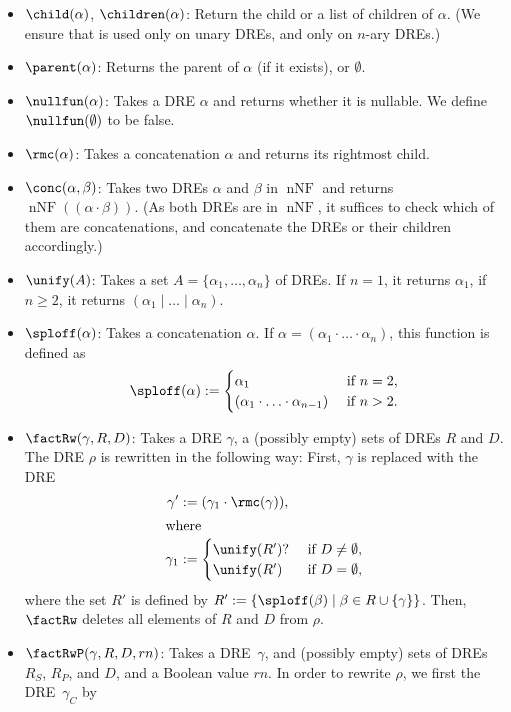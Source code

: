\documentclass[a4paper,11pt, svgnames,titlepage]{article}
\newcommand{\rxo}{\mathtt{?}}
\newcommand{\rxc}{\cdot}
\DeclareMathOperator{\ror}{\mathtt{|}}
\newcommand{\df}{:=}
\DeclareMathOperator{\nnf}{nNF}
\begin{document}
\begin{itemize}
	\item $\child(\alpha)$, $\children(\alpha)$: Return the child or a list of children of $\alpha$. (We ensure that \child is used only on unary DREs, and \children only on $n$-ary DREs.)
	\item $\parent(\alpha)$: Returns the parent of $\alpha$ (if it exists), or $\emptyset$.
	\item $\nullfun(\alpha)$: Takes a DRE $\alpha$ and returns whether it is nullable. We define $\nullfun(\emptyset)$ to be false.
	\item $\rmc(\alpha)$: Takes a concatenation $\alpha$ and returns its rightmost child.
	\item $\conc(\alpha,\beta)$: Takes two DREs $\alpha$ and $\beta$ in $\nnf$ and returns $\nnf((\alpha\rxc\beta))$. (As both DREs are in $\nnf$, it suffices to check which of them are concatenations, and concatenate the DREs or their children accordingly.) 
	\item $\unify(A)$: Takes a set $A=\{\alpha_1,\ldots,\alpha_n\}$ of DREs. If $n=1$, it returns $\alpha_1$, if $n\geq 2$, it returns $(\alpha_1\ror\ldots\ror\alpha_n)$.
	\item $\sploff(\alpha)$: Takes a concatenation $\alpha$. If $\alpha=(\alpha_1\rxc\ldots\rxc \alpha_n)$, this function is defined as
	\[\sploff(\alpha)\df \begin{cases}
		\alpha_1 & \text{ if $n=2$},\\
		(\alpha_1\rxc\ldots\rxc \alpha_{n-1})& \text{ if $n>2$.}
	\end{cases}\]
	\item $\factRw(\gamma,R,D)$: Takes a DRE $\gamma$, a (possibly empty) sets of DREs $R$ and $D$. The DRE $\rho$ is  rewritten in the following way: First, $\gamma$ is replaced with the DRE 
\begin{align*}
	\gamma'&\df (\gamma_1\rxc \rmc(\gamma)),\\
	\shortintertext{where}
	\gamma_1&\df \begin{cases}
		\unify(R')\rxo & \text{ if $D\neq \emptyset$,}\\
		\unify(R') & \text{ if $D=\emptyset$,}
	\end{cases}
\end{align*}
where the set $R'$ is defined by $R'\df\{\sploff(\beta)\mid \beta\in R\cup\{\gamma\}\}$. Then, $\factRw$ deletes all elements of $R$ and $D$ from $\rho$.
\item $\factRwP(\gamma,R,D,rn)$: Takes a DRE~$\gamma$, and (possibly empty) sets of DREs $R_S$, $R_P$, and $D$, and a Boolean value $rn$. In order to rewrite $\rho$, we first the DRE~$\gamma_{C}$ by

\end{itemize}
\end{document}
